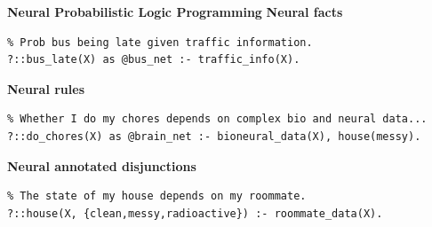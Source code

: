 \documentclass[aspectratio=169]{beamer}
\begin{document}
\begin{frame}[fragile]{\textbf{Neural Probabilistic Logic Programming}}
  \textbf{\color{palette-orange}Neural facts}

  \begin{verbatim}
% Prob bus being late given traffic information.
?::bus_late(X) as @bus_net :- traffic_info(X).
  \end{verbatim}

  \pause%

  \vspace{0.5cm}

  \textbf{\color{palette-orange}Neural rules}

  \begin{verbatim}
% Whether I do my chores depends on complex bio and neural data...
?::do_chores(X) as @brain_net :- bioneural_data(X), house(messy).
  \end{verbatim}

  \pause%

  \vspace{0.5cm}

  \textbf{\color{palette-orange}Neural annotated disjunctions}

  \begin{verbatim}
% The state of my house depends on my roommate.
?::house(X, {clean,messy,radioactive}) :- roommate_data(X).
  \end{verbatim}
\end{frame}

\end{document}

